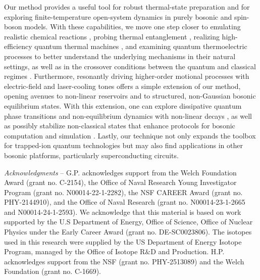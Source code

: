 \documentclass[%
reprint,
superscriptaddress,
amsmath,amssymb,
aps,
prl,
floatfix,
]{revtex4-2}
\begin{document}
Our method provides a useful tool for robust thermal-state preparation and for exploring finite-temperature open-system dynamics in purely bosonic and spin-boson models. With these capabilities, we move one step closer to emulating realistic chemical reactions \cite{marcus1993electron,olaya-agudelo2025open}, probing thermal entanglement \cite{valido2013gaussian,chanda2018entanglement}, realizing high-efficiency quantum thermal machines \cite{rossnagel2016engine,maslennikov2019fridge}, and examining quantum thermoelectric processes \cite{roy2010thermoelectric,tejero2025asym} to better understand the underlying mechanisms in their natural settings, as well as in the crossover conditions between the quantum and classical regimes \cite{barbara1996et}. Furthermore, resonantly driving higher-order motional processes with electric-field and laser-cooling tones offers a simple extension of our method, opening avenues to non-linear reservoirs and to structured, non-Gaussian bosonic equilibrium states. With this extension, one can explore dissipative quantum phase transitions and non-equilibrium dynamics with non-linear decays \cite{shah2024dissipative,mylnikov2025twophonon,liu2025observationsynchronizationquantumvan}, as well as possibly stabilize non-classical states that enhance protocols for bosonic computation and simulation \cite{rojkov2024stabilizationcatstatemanifoldsusing,matsos2024gkp}. Lastly, our technique not only expands the toolbox for trapped-ion quantum technologies but may also find applications in other bosonic platforms, particularly superconducting circuits.

\emph{Acknowledgments} -- 
G.P. acknowledges support from the Welch Foundation Award (grant no. C-2154), the Office of Naval Research Young Investigator Program (grant no. N00014-22-1-2282), the NSF CAREER Award (grant no. PHY-2144910), and the Office of Naval Research (grant no. N00014-23-1-2665 and N00014-24-1-2593). We acknowledge that this material is based on work supported by the U.S Department of Energy, Office of Science, Office of Nuclear Physics under the Early Career Award (grant no. DE-SC0023806). The isotopes used in this research were supplied by the US Department of Energy Isotope Program, managed by the Office of Isotope R$\&$D and Production. H.P. acknowledges support from the NSF (grant no. PHY-2513089) and the Welch Foundation (grant no. C-1669).
\end{document}
